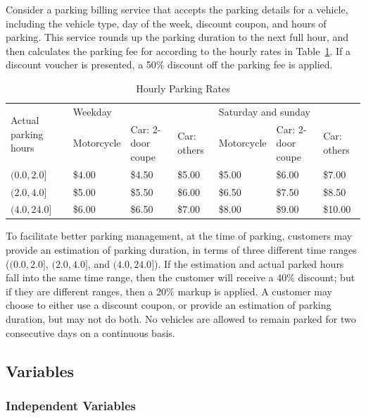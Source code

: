 \documentclass[10pt,journal,compsoc]{IEEEtran}
\begin{document}
Consider a parking billing service that accepts the parking details for a vehicle, including the vehicle type, day of the week, discount coupon, and hours of parking.
This service  rounds up the parking duration to the next full hour, and then calculates the parking fee for according to the hourly rates in Table~\ref{tab:hourlyRate}.
If a discount voucher is presented, a 50\% discount off the parking fee is applied.

\begin{table}
  \caption{Hourly Parking Rates}
  \label{tab:hourlyRate}
  \centering
  \begin{tabular}{lllllll} \toprule
  \multirow{2}{*}{Actual parking hours} &\multicolumn{3}{l}{Weekday}&\multicolumn{3}{l}{Saturday and sunday} \\ \cmidrule(lr){2-4} \cmidrule(lr){5-7}
                                  &Motorcycle  &Car: 2-door coupe  &Car: others    &Motorcycle  &Car: 2-door coupe  &Car: others \\ \midrule
  $(0.0,2.0]$                     &\$4.00        &\$4.50          &\$5.00      &\$5.00        &\$6.00        &\$7.00 \\
  $(2.0,4.0]$                     &\$5.00        &\$5.50          &\$6.00      &\$6.50      &\$7.50        &\$8.50  \\
  $(4.0,24.0]$                    &\$6.00        &\$6.50          &\$7.00      &\$8.00      &\$9.00        &\$10.00  \\ \bottomrule
  \end{tabular}
\end{table}

To facilitate better parking management, at the time of parking, customers may provide an estimation of parking duration, in terms of three different time ranges ($(0.0,2.0]$, $(2.0,4.0]$, and $(4.0,24.0]$).
If the estimation and actual parked hours fall into the same time range, then the customer will receive a 40\% discount;
but if they are different ranges, then a 20\% markup is applied.
A customer may choose to either use a discount coupon, or provide an estimation of parking duration, but may not do both.
No vehicles are allowed to remain parked for two consecutive days on a continuous basis.

\subsection{Variables}
\label{sec:variables}

\subsubsection{Independent Variables}
\label{sec:independentvariables}
\end{document}
